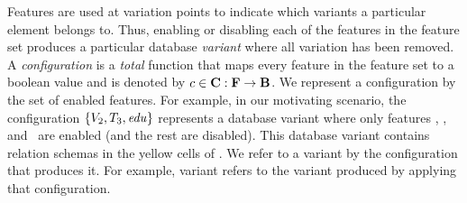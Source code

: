 Features are used at variation points to indicate which variants a particular
element belongs to.
Thus, enabling or disabling each of
the features in the feature set
produces a particular database \emph{variant} where
all variation has been removed. 
A \emph{configuration} is a \emph{total} function
that maps every feature in the feature set to a boolean value and is denoted
by $\config \in \confSet : \fSet \to \bSet$.
We represent a configuration by the set of enabled features.
For example, in our motivating scenario, the configuration \ensuremath{
\setDef {\vTwo,\tThree,\edu}
}
represents a database variant where only features \vTwo, \tThree, and \edu\ are
enabled (and the rest are disabled).
This database variant contains relation schemas in the yellow cells of .
We refer to a variant by the configuration that produces it.
For example, 
variant \setDef {\vTwo,\tThree,\edu} refers to the variant produced by applying
that configuration.

